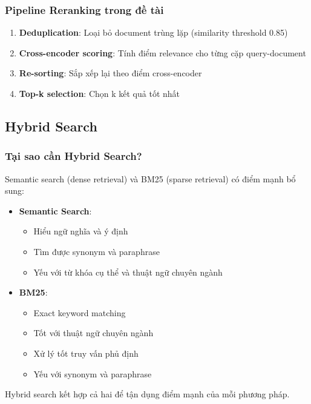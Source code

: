 \documentclass[../DoAn.tex]{subfiles}
\begin{document}
\subsubsection{Pipeline Reranking trong đề tài}
\begin{enumerate}
    \item \textbf{Deduplication}: Loại bỏ document trùng lặp (similarity threshold 0.85)
    \item \textbf{Cross-encoder scoring}: Tính điểm relevance cho từng cặp query-document
    \item \textbf{Re-sorting}: Sắp xếp lại theo điểm cross-encoder
    \item \textbf{Top-k selection}: Chọn k kết quả tốt nhất
\end{enumerate}

\subsection{Hybrid Search}

\subsubsection{Tại sao cần Hybrid Search?}
Semantic search (dense retrieval) và BM25 (sparse retrieval) có điểm mạnh bổ sung:

\begin{itemize}
    \item \textbf{Semantic Search}:
    \begin{itemize}
        \item Hiểu ngữ nghĩa và ý định
        \item Tìm được synonym và paraphrase
        \item Yếu với từ khóa cụ thể và thuật ngữ chuyên ngành
    \end{itemize}
    \item \textbf{BM25}:
    \begin{itemize}
        \item Exact keyword matching
        \item Tốt với thuật ngữ chuyên ngành
        \item Xử lý tốt truy vấn phủ định
        \item Yếu với synonym và paraphrase
    \end{itemize}
\end{itemize}

Hybrid search kết hợp cả hai để tận dụng điểm mạnh của mỗi phương pháp.
\end{document}
